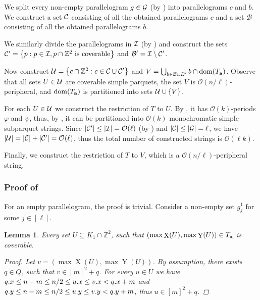 \documentclass[11pt]{article}
\newcommand{\Z}{\mathbb{Z}}
\renewcommand{\O}{\mathcal{O}}
\renewcommand{\phi}{\varphi}
\newcommand{\set}[1]{\left\lbrace #1 \right\rbrace}
\theoremstyle{plain}
\newtheorem{lemma}{Lemma}
\theoremstyle{definition}
\theoremstyle{remark}
\DeclareMathOperator*{\X}{X}
\DeclareMathOperator*{\Y}{Y}
\begin{document}
\newcommand{\B}{\mathcal{B}}
We split every non-empty parallelogram $g \in \mathcal{G}$ (by ) into parallelograms $c$ and $b$.
We construct a set $\mathcal{C}$ consisting of all the obtained parallelograms $c$ and a set $\B$ consisting of all the obtained parallelograms $b$.

We similarly divide the parallelograms in $\mathcal{I}$ (by ) and construct the sets $\C' = \set{p : p \in \I, p \cap \Z^2 \text{ is coverable}}$ and $\B' = \I \setminus \C'$.

Now construct $\U = \set{c \cap \Z^2 : c \in \C \cup \C'}$ and $V = \bigcup_{b \in \B \cup B'} b \cap \d{\Ta}$.
Observe that all sets $U \in \mathcal{U}$ are coverable simple parquets, the set $V$ is $\O(n / \ell)$-peripheral, and $\operatorname*{dom}(T_\mathbf{a})$ is partitioned into sets $\U \cup \set{V}$.

For each $U \in \mathcal{U}$ we construct the restriction of $T$ to $U$.
By , it has $\O(k)$-periods $\phi$ and $\psi$, thus, by , it can be partitioned into $\O(k)$ monochromatic simple subparquet strings.
Since $|\C'| \le |\I| = \O(\ell)$ (by ) and $|\mathcal{C}| \le |\mathcal{G}| = \ell$, we have $|\U| = |\C| + |\C'| = \O(\ell)$, thus the total number of constructed strings is $\O(\ell k)$.

Finally, we construct the restriction of $T$ to $V$, which is a $\O(n / \ell)$-peripheral string.


\subsubsection{Proof of } \label{parallelogram_split_lemma_proof}
For an empty parallelogram, the proof is trivial.
Consider a non-empty set $g^1_j$ for some $j \in [\ell]$.

\begin{lemma}\label{coverability_condition}
	Every set $U \subseteq K_1 \cap \Z^2$, such that $(\max \X(U), \max \Y(U)) \in \Ta$ is coverable.
	\begin{proof}
		Let $v = (\max \X(U), \max \Y(U))$.
		By assumption, there exists $q \in Q$, such that $v \in [m]^2 + q$.
		For every $u \in U$ we have
		$q.x \le n - m \le n / 2 \le u.x \le v.x < q.x + m$
		and $q.y \le n - m \le n / 2 \le u.y \le v.y < q.y + m$,
		thus $u \in [m]^2 + q$.
	\end{proof}
\end{lemma}
\end{document}
